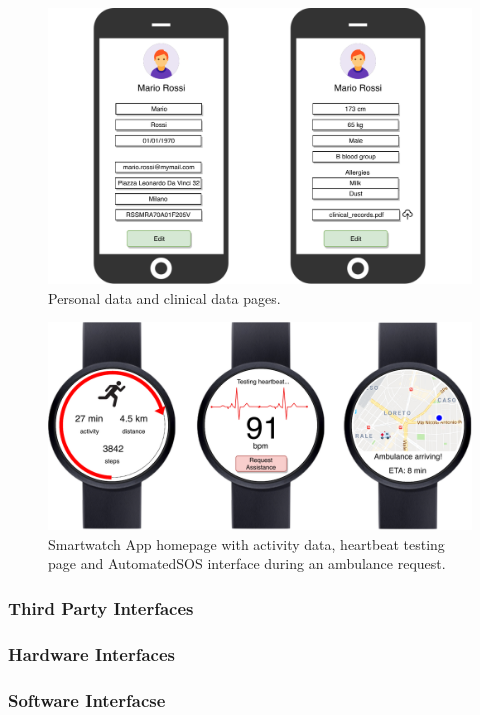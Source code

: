\documentclass[12pt,a4paper]{article}
\begin{document}
	\begin{figure}[H]
		\centering
		\includegraphics[width=1.0\linewidth]{Images/data-pages}
		\caption{Personal data and clinical data pages.}
		\label{fig:data-pages}
	\end{figure}
	\begin{figure}[h]
		\centering
		\includegraphics[width=1.0\linewidth]{Images/smartwatch}
		\caption{Smartwatch App homepage with activity data, heartbeat testing page and AutomatedSOS interface during an ambulance request.}
		\label{fig:smartwatch}
	\end{figure}
	\newpage
	\subsubsection{Third Party Interfaces}
	
	\newpage
	\subsubsection{Hardware Interfaces}
	\subsubsection{Software Interfacse}
\end{document}
